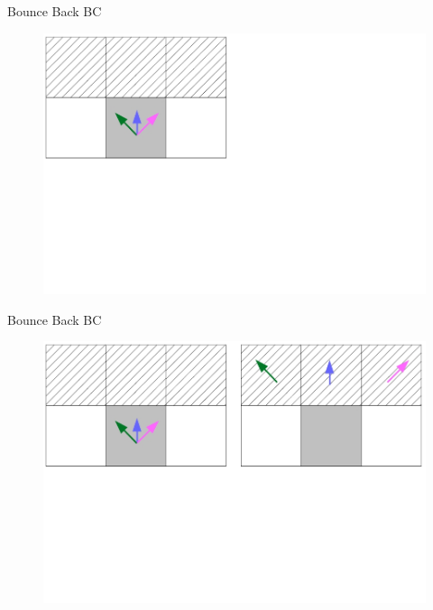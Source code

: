 \documentclass[9pt]{beamer}
\begin{document}
\begin{frame}[t]{Bounce Back BC}
\begin{figure}
\includegraphics[scale=0.3]{images/bounce-back-bc-1.jpg}
\centering
\end{figure}
\end{frame}

\begin{frame}[t]{Bounce Back BC}
\begin{figure}
\includegraphics[scale=0.3]{images/bounce-back-bc-2.jpg}
\centering
\end{figure}
\end{frame}
\end{document}
